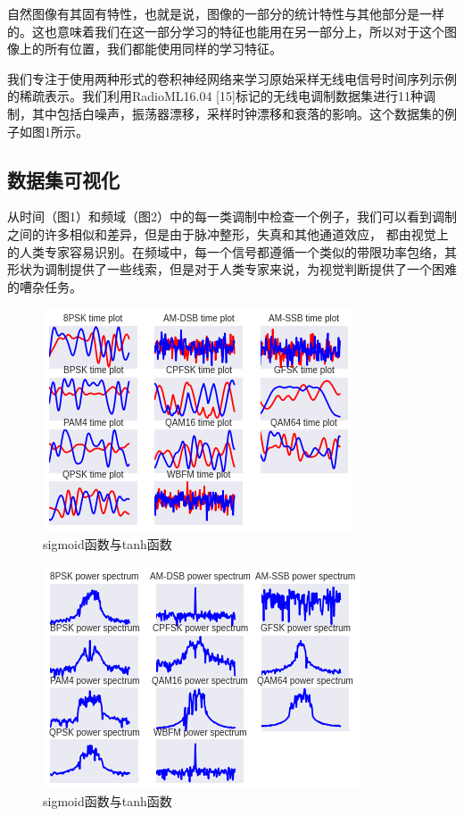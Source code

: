 自然图像有其固有特性，也就是说，图像的一部分的统计特性与其他部分是一样的。这也意味着我们在这一部分学习的特征也能用在另一部分上，所以对于这个图像上的所有位置，我们都能使用同样的学习特征。\par

我们专注于使用两种形式的卷积神经网络来学习原始采样无线电信号时间序列示例的稀疏表示。我们利用RadioML16.04 [15]标记的无线电调制数据集进行11种调制，其中包括白噪声，振荡器漂移，采样时钟漂移和衰落的影响。这个数据集的例子如图1所示。\par

\subsection{数据集可视化}

从时间（图1）和频域（图2）中的每一类调制中检查一个例子，我们可以看到调制之间的许多相似和差异，但是由于脉冲整形，失真和其他通道效应， 都由视觉上的人类专家容易识别。在频域中，每一个信号都遵循一个类似的带限功率包络，其形状为调制提供了一些线索，但是对于人类专家来说，为视觉判断提供了一个困难的嘈杂任务。\par
\begin{figure}[!h]
	\centering
	\includegraphics[scale=0.9]{figures/chapter_3/signal_view_1}
	\caption{sigmoid函数与tanh函数}\label{fig_2_2}
\end{figure}
\begin{figure}[!h]
	\centering
	\includegraphics[scale=0.9]{figures/chapter_3/signal_view_2}
	\caption{sigmoid函数与tanh函数}\label{fig_2_2}
\end{figure}

